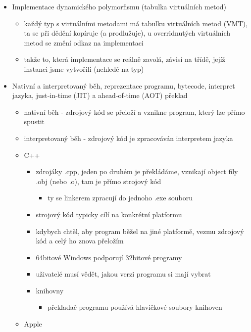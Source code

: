 \begin{itemize}
\begin{itemize}
\item dalším synchronizačním primitivem je semafor, používá se k tomu, aby s objektem najednou mohlo pracovat jen omezené množství vláken
\end{itemize}
\item Implementace dynamického polymorfismu (tabulka virtuálních metod)
\begin{itemize}
\item každý typ s virtuálními metodami má tabulku virtuálních metod (VMT), ta se při dědění kopíruje (a prodlužuje), u overridnutých virtuálních metod se změní odkaz na implementaci
\item takže to, která implementace se reálně zavolá, závisí na třídě, jejíž instanci jsme vytvořili (nehledě na typ)
\end{itemize}
\item Nativní a interpretovaný běh, reprezentace programu, bytecode, interpret jazyka, just-in-time (JIT) a ahead-of-time (AOT) překlad
\begin{itemize}
\item nativní běh - zdrojový kód se přeloží a vznikne program, který lze přímo spustit
\item interpretovaný běh - zdrojový kód je zpracováván interpretem jazyka
\item C++
\begin{itemize}
\item zdrojáky .cpp, jeden po druhém je překládáme, vznikají object fily .obj (nebo .o), tam je přímo strojový kód
\begin{itemize}
\item ty se linkerem zpracují do jednoho .exe souboru
\end{itemize}
\item strojový kód typicky cílí na konkrétní platformu
\item kdybych chtěl, aby program běžel na jiné platformě, vezmu zdrojový kód a celý ho znova přeložím
\item 64bitové Windows podporují 32bitové programy
\item uživatelé musí vědět, jakou verzi programu si mají vybrat
\item knihovny
\begin{itemize}
\item překladač programu používá hlavičkové soubory knihoven
\end{itemize}
\end{itemize}
\item Apple
\begin{itemize}

\end{itemize}
\end{itemize}
\end{itemize}

